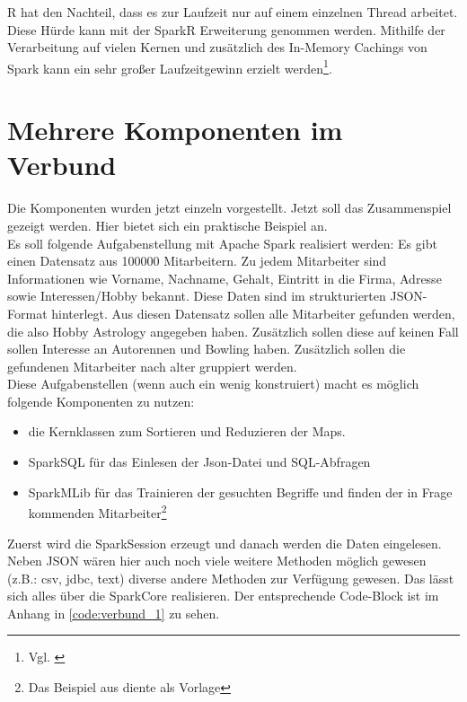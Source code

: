 \noindent
R hat den Nachteil, dass es zur Laufzeit nur auf einem einzelnen Thread arbeitet. Diese Hürde kann mit der SparkR Erweiterung genommen werden. Mithilfe der Verarbeitung auf vielen Kernen und zusätzlich des In-Memory Cachings von Spark kann ein sehr großer Laufzeitgewinn erzielt werden\footnote{Vgl. \cite{VYL+16}}.

\newpage
\section{Mehrere Komponenten im Verbund}

Die Komponenten wurden jetzt einzeln vorgestellt. Jetzt soll das Zusammenspiel gezeigt werden. Hier bietet sich ein praktische Beispiel an. \\

\noindent
Es soll folgende Aufgabenstellung mit Apache Spark realisiert werden: Es gibt einen Datensatz aus 100000 Mitarbeitern. Zu jedem Mitarbeiter sind Informationen wie Vorname, Nachname, Gehalt, Eintritt in die Firma, Adresse sowie Interessen/Hobby bekannt. Diese Daten sind im strukturierten JSON-Format hinterlegt. 
Aus diesen Datensatz sollen alle Mitarbeiter gefunden werden, die also Hobby Astrology angegeben haben. Zusätzlich sollen diese auf keinen Fall sollen Interesse an Autorennen und Bowling haben. Zusätzlich sollen die gefundenen Mitarbeiter nach alter gruppiert werden. \\
Diese Aufgabenstellen (wenn auch ein wenig konstruiert) macht es möglich folgende Komponenten zu nutzen:
\begin{itemize}
	\item die Kernklassen zum Sortieren und Reduzieren der Maps.
	\item SparkSQL für das Einlesen der Json-Datei und SQL-Abfragen
	\item SparkMLib für das Trainieren der gesuchten Begriffe und finden der in Frage kommenden Mitarbeiter\footnote{Das Beispiel aus \cite{GITHUB_EXAMPLE} diente als Vorlage}	
\end{itemize}  

\noindent
Zuerst wird die SparkSession erzeugt und danach werden die Daten eingelesen. Neben JSON wären hier auch noch viele weitere Methoden möglich gewesen (z.B.: csv, jdbc, text) diverse andere Methoden zur Verfügung gewesen. Das lässt sich alles über die SparkCore realisieren. Der entsprechende Code-Block ist im Anhang in \autoref{code:verbund_1} zu sehen.\\

